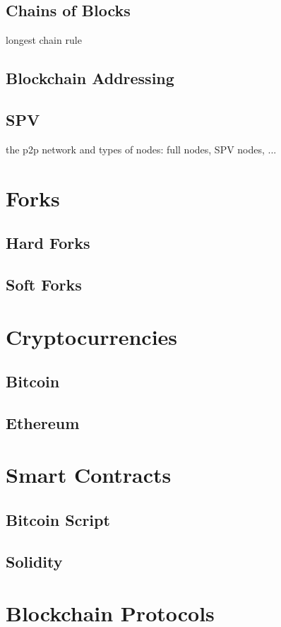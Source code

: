 \subsection{Chains of Blocks}
longest chain rule
\subsection{Blockchain Addressing}
\subsection{SPV}
the p2p network and types of nodes: full nodes, SPV nodes, ...

\section{Forks}
\subsection{Hard Forks}
\subsection{Soft Forks}

\section{Cryptocurrencies}
\subsection{Bitcoin}
\subsection{Ethereum}

\section{Smart Contracts}
\subsection{Bitcoin Script}
\subsection{Solidity}


\section{Blockchain Protocols}

